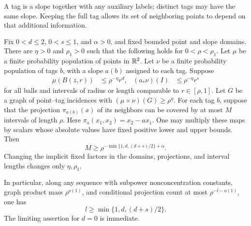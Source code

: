 A tag is a slope together with any auxiliary labels; distinct tags
may have the same slope. Keeping the full tag allows its set of
neighboring points to depend on that additional information.

\begin{theorem}
\label{thm:planar-projection}
Fix \(0<d\le2\), \(0<s\le1\), and \(\alpha>0\), and fixed bounded
point and slope domains. There are \(\eta>0\) and \(\rho_1>0\) such
that the following holds for \(0<\rho<\rho_1\).
Let \(\mu\) be a finite probability population of points in \(\mathbb R^2\).
Let \(\nu\) be a finite probability population of tags \(b\), with a
slope \(a(b)\) assigned to each tag. Suppose
\begin{align}
 \mu(B(z,r))&\le \rho^{-\eta}r^d,
 & (a_*\nu)(I)&\le \rho^{-\eta}r^s
 \label{eq:projection-populations}
\end{align}
for all balls and intervals of radius or length comparable to
\(r\in[\rho,1]\). Let \(G\) be a graph of point--tag incidences with
\((\mu\times\nu)(G)\ge\rho^\eta\).
For each tag \(b\), suppose that the projection
\(\pi_{a(b)}(x)\) of its neighbors can be covered by at most \(M\)
intervals of length \(\rho\). Here
\(\pi_a(x_1,x_2)=x_2-a x_1\). One may multiply these maps by
scalars whose absolute values have fixed positive lower and upper bounds.
Then
\begin{equation}
 M\ge \rho^{-\min\{1,d,(d+s)/2\}+\alpha}.
 \label{eq:weighted-projection-finite}
\end{equation}
Changing the implicit fixed factors in the domains, projections,
and interval lengths changes only \(\eta,\rho_1\).

In particular, along any sequence with subpower nonconcentration
constants, graph product mass \(\rho^{o(1)}\), and conditional
projection count at most \(\rho^{-l-o(1)}\), one has
\begin{equation}
 l\ge \min\{1,d,(d+s)/2\}.
 \label{eq:weighted-projection-limit}
\end{equation}
The limiting assertion for \(d=0\) is immediate.
\end{theorem}

